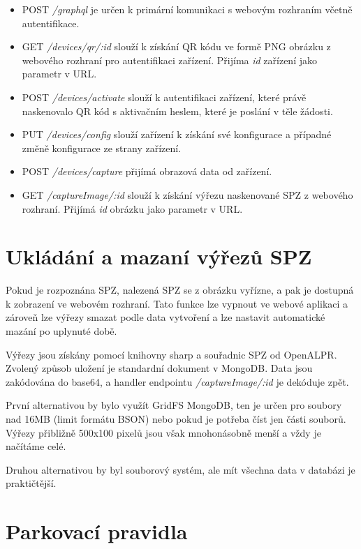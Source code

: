 \begin{itemize}
  \setlength\itemsep{.05em}
  \item POST \textit{/graphql} je určen k primární komunikaci s webovým rozhraním včetně autentifikace.
  \item GET \textit{/devices/qr/:id} slouží k získání QR kódu ve formě PNG obrázku z webového rozhraní pro autentifikaci zařízení.
        Přijíma \textit{id} zařízení jako parametr v URL.
  \item POST \textit{/devices/activate} slouží k autentifikaci zařízení, které právě naskenovalo QR kód s aktivačním heslem, které je poslání v těle žádosti.
  \item PUT \textit{/devices/config} slouží zařízení k získání své konfigurace a případné změně konfigurace ze strany zařízení.
  \item POST \textit{/devices/capture} přijímá obrazová data od zařízení.
  \item GET \textit{/captureImage/:id} slouží k získání výřezu naskenované SPZ z webového rozhraní. Přijímá \textit{id} obrázku jako parametr v URL.
\end{itemize}

\section{Ukládání a mazaní výřezů SPZ}

\noindent
Pokud je rozpoznána SPZ, nalezená SPZ se z obrázku vyřízne, a pak je dostupná k zobrazení ve webovém rozhraní.
Tato funkce lze vypnout ve webové aplikaci a zároveň lze výřezy smazat podle data vytvoření a
lze nastavit automatické mazání po uplynuté době.

Výřezy jsou získány pomocí knihovny sharp a souřadnic SPZ od OpenALPR.
Zvolený způsob uložení je standardní dokument v MongoDB. Data jsou zakódována do base64,
a handler endpointu \textit{/captureImage/:id} je dekóduje zpět.

První alternativou by bylo využít GridFS MongoDB, ten je určen pro soubory
nad 16MB (limit formátu BSON) nebo pokud je potřeba číst jen části souborů.
Výřezy přibližně 500x100 pixelů jsou však mnohonásobně menší a vždy je načítáme celé.

Druhou alternativou by byl souborový systém, ale mít všechna data v databázi je praktičtější.

\section{Parkovací pravidla} \label{analysis_parking_schema}

